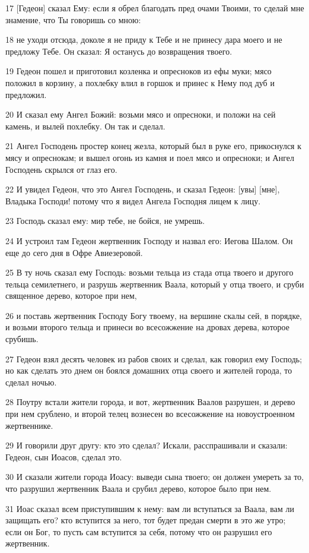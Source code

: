 \par 17 [Гедеон] сказал Ему: если я обрел благодать пред очами Твоими, то сделай мне знамение, что Ты говоришь со мною:
\par 18 не уходи отсюда, доколе я не приду к Тебе и не принесу дара моего и не предложу Тебе. Он сказал: Я останусь до возвращения твоего.
\par 19 Гедеон пошел и приготовил козленка и опресноков из ефы муки; мясо положил в корзину, а похлебку влил в горшок и принес к Нему под дуб и предложил.
\par 20 И сказал ему Ангел Божий: возьми мясо и опресноки, и положи на сей камень, и вылей похлебку. Он так и сделал.
\par 21 Ангел Господень простер конец жезла, который был в руке его, прикоснулся к мясу и опреснокам; и вышел огонь из камня и поел мясо и опресноки; и Ангел Господень скрылся от глаз его.
\par 22 И увидел Гедеон, что это Ангел Господень, и сказал Гедеон: [увы] [мне], Владыка Господи! потому что я видел Ангела Господня лицем к лицу.
\par 23 Господь сказал ему: мир тебе, не бойся, не умрешь.
\par 24 И устроил там Гедеон жертвенник Господу и назвал его: Иегова Шалом. Он еще до сего дня в Офре Авиезеровой.
\par 25 В ту ночь сказал ему Господь: возьми тельца из стада отца твоего и другого тельца семилетнего, и разрушь жертвенник Ваала, который у отца твоего, и сруби священное дерево, которое при нем,
\par 26 и поставь жертвенник Господу Богу твоему, на вершине скалы сей, в порядке, и возьми второго тельца и принеси во всесожжение на дровах дерева, которое срубишь.
\par 27 Гедеон взял десять человек из рабов своих и сделал, как говорил ему Господь; но как сделать это днем он боялся домашних отца своего и жителей города, то сделал ночью.
\par 28 Поутру встали жители города, и вот, жертвенник Ваалов разрушен, и дерево при нем срублено, и второй телец вознесен во всесожжение на новоустроенном жертвеннике.
\par 29 И говорили друг другу: кто это сделал? Искали, расспрашивали и сказали: Гедеон, сын Иоасов, сделал это.
\par 30 И сказали жители города Иоасу: выведи сына твоего; он должен умереть за то, что разрушил жертвенник Ваала и срубил дерево, которое было при нем.
\par 31 Иоас сказал всем приступившим к нему: вам ли вступаться за Ваала, вам ли защищать его? кто вступится за него, тот будет предан смерти в это же утро; если он Бог, то пусть сам вступится за себя, потому что он разрушил его жертвенник.
